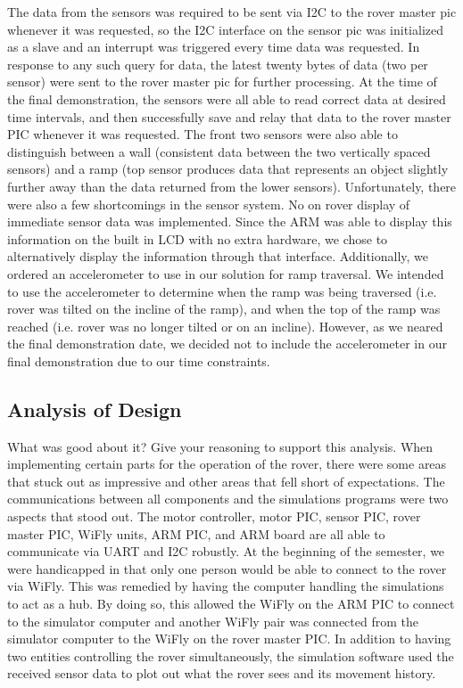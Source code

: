 The data from the sensors was required to be sent via I2C to the rover master pic whenever it was requested, so the I2C interface on the sensor pic was initialized as a slave and an interrupt was triggered every time data was requested.  In response to any such query for data, the latest twenty bytes of data (two per sensor) were sent to the rover master pic for further processing.  
At the time of the final demonstration, the sensors were all able to read correct data at desired time intervals, and then successfully save and relay that data to the rover master PIC whenever it was requested.  The front two sensors were also able to distinguish between a wall (consistent data between the two vertically spaced sensors) and a ramp (top sensor produces data that represents an object slightly further away than the data returned from the lower sensors).
Unfortunately, there were also a few shortcomings in the sensor system.  No on rover display of immediate sensor data was implemented.  Since the ARM was able to display this information on the built in LCD with no extra hardware, we chose to alternatively display the information through that interface.  Additionally, we ordered an accelerometer to use in our solution for ramp traversal.  We intended to use the accelerometer to determine when the ramp was being traversed (i.e. rover was tilted on the incline of the ramp), and when the top of the ramp was reached (i.e. rover was no longer tilted or on an incline).  However, as we neared the final demonstration date, we decided not to include the accelerometer in our final demonstration due to our time constraints.  

\subsection{Analysis of Design}
What was good about it? Give your reasoning to support this analysis.
When implementing certain parts for the operation of the rover, there were some areas that stuck out as impressive and other areas that fell short of expectations. The communications between all components and the simulations programs were two aspects that stood out. The motor controller, motor PIC, sensor PIC, rover master PIC, WiFly units, ARM PIC, and ARM board are all able to communicate via UART and I2C robustly. At the beginning of the semester, we were handicapped in that only one person would be able to connect to the rover via WiFly. This was remedied by having the computer handling the simulations to act as a hub. By doing so, this allowed the WiFly on the ARM PIC to connect to the simulator computer and another WiFly pair was connected from the simulator computer to the WiFly on the rover master PIC. In addition to having two entities controlling the rover simultaneously, the simulation software used the received sensor data to plot out what the rover sees and its movement history.


